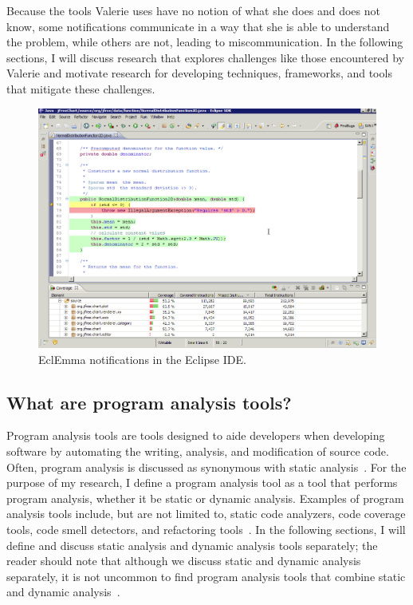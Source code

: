 \documentclass{llncs}
\begin{document}
Because the tools Valerie uses have no notion of what she does and does not know, some notifications communicate in a way that she is able to understand the problem, while others are not, leading to  miscommunication. In the following sections, I will discuss research that explores challenges like those encountered by Valerie and motivate research for developing techniques, frameworks, and tools that mitigate these challenges.

\begin{figure} [ht]
	\centering
	\includegraphics[width=\textwidth]{figs/eclemma.png}
	\caption{EclEmma notifications in the Eclipse IDE.}
	\label{fig:ecl}
\end{figure}

\subsection{What are program analysis tools?}
Program analysis tools are tools designed to aide developers when developing software by automating the writing, analysis, and modification of source code.
Often, program analysis is discussed as synonymous with static analysis~\cite{nielson2015principles}. 
For the purpose of my research, I define a program analysis tool as a tool that performs program analysis, whether it be static or dynamic analysis.
Examples of program analysis tools include, but are not limited to, static code analyzers, code coverage tools, code smell detectors, and refactoring tools~\cite{adolph2011using,Murphy-Hill:2010:Ambient,ge2012reconciling}.
In the following sections, I will define and discuss static analysis and dynamic analysis tools separately; the reader should note that although we discuss static and dynamic analysis separately, it is not uncommon to find program analysis tools that combine static and dynamic analysis~\cite{ernst2003static}.                                                
\end{document}
